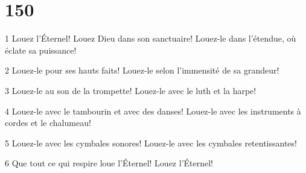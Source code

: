 \chapter{150}

\par 1 Louez l'Éternel! Louez Dieu dans son sanctuaire! Louez-le dans l'étendue, où éclate sa puissance!
\par 2 Louez-le pour ses hauts faits! Louez-le selon l'immensité de sa grandeur!
\par 3 Louez-le au son de la trompette! Louez-le avec le luth et la harpe!
\par 4 Louez-le avec le tambourin et avec des danses! Louez-le avec les instruments à cordes et le chalumeau!
\par 5 Louez-le avec les cymbales sonores! Louez-le avec les cymbales retentissantes!
\par 6 Que tout ce qui respire loue l'Éternel! Louez l'Éternel!


